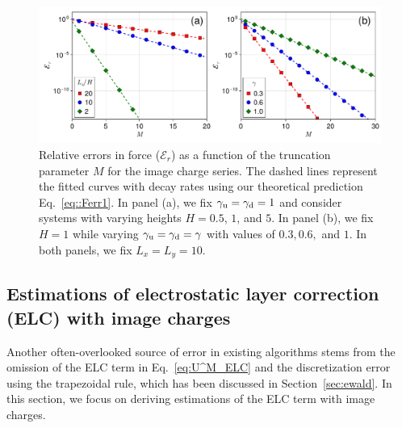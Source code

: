 \begin{figure}[htbp]
    \centering
    \includegraphics[width=0.98\linewidth]{figs/icm_error_force.pdf}
    \caption{
        Relative errors in force ($\mathcal{E}_r$) as a function of the truncation parameter $M$ for the image charge series. 
        The dashed lines represent the fitted curves with decay rates using our theoretical prediction Eq.~\eqref{eq::Ferr1}. 
        In panel (a), we fix $\gamma_{\text{u}} = \gamma_{\text{d}} = 1$ and consider systems with varying heights $H = 0.5$, $1$, and $5$. In panel (b), we fix $H = 1$ while varying $\gamma_{\text{u}} = \gamma_{\text{d}} = \gamma$ with values of $0.3, 0.6,$ and $1$. In both panels, we fix $L_x=L_y=10$.
    }
    \label{fig:icm_error_force}
\end{figure}

\subsection{Estimations of electrostatic layer correction (ELC) with image charges}\label{sec:error_reform}

Another often-overlooked source of error in existing algorithms stems from the omission of the ELC term in Eq.~\eqref{eq:U^M_ELC} and the discretization error using the trapezoidal rule, which has been discussed in Section~\ref{sec:ewald}. 
In this section, we focus on deriving estimations of the ELC term with image charges.

